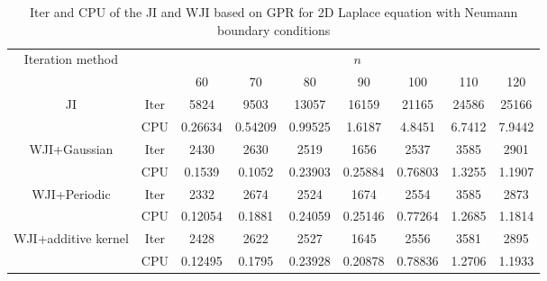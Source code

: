 \documentclass[preprint,review,sort&compress,3p]{elsarticle}
\begin{document}
\begin{table}[htbp!]
	\caption{Iter and CPU of the JI and WJI based on GPR for { 2D Laplace equation with Neumann boundary conditions}}
	\label{Tab:2d_Laplace_Neumann}
	\centering
	\begin{tabular}{ccccccccc}
		\hline
		\multirow{2}{*}{Iteration method} &     & \multicolumn{7}{c}{$n$}           \\
		\cline{3-9} 
		&     & 60                   & 70   & 80    & 90    & 100   & 110   & 120 \\ 
		\hline
		\multirow{2}{*}{JI}           & Iter   & 5824 &  9503  & 13057 & 16159 & 21165 &  24586 &25166 \\
		\cline{2-9} 
		& CPU & 0.26634  & 0.54209  &  0.99525  &  1.6187  & 4.8451 &  6.7412 &   7.9442 \\  \hline
		\multirow{2}{*}{  WJI+Gaussian}         & Iter  &  2430  & 2630 & 2519 &  1656 & 2537 &  3585 & 2901 \\ 
		\cline{2-9} 
		& CPU & 0.1539 &   0.1052 &  0.23903 & 0.25884 & 0.76803 &   1.3255 & 1.1907 \\ 
		\hline
		\multirow{2}{*}{  WJI+Periodic}         & Iter  &  2332 &   2674 & 2524 & 1674 & 2554 & 3585 &2873 \\ 
		\cline{2-9} 
		& CPU &  0.12054 &  0.1881 & 0.24059 &  0.25146 & 0.77264 &  1.2685 & 1.1814 \\ 
		\hline
		\multirow{2}{*}{  WJI+additive kernel}         & Iter  & 2428 &  2622 & 2527 &  1645  & 2556 & 3581 &  2895 \\ 
		\cline{2-9} 
		& CPU &   0.12495 & 0.1795        &   0.23928 &  0.20878  & 0.78836 & 1.2706 & 1.1933 \\ 
		\hline
	\end{tabular}
\end{table}
\end{document}

